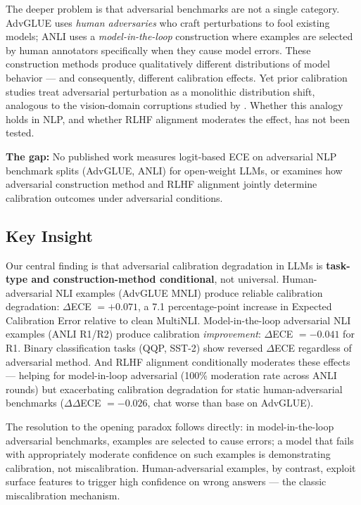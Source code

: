 The deeper problem is that adversarial benchmarks are not a single category. AdvGLUE uses \textit{human adversaries} who craft perturbations to fool existing models; ANLI uses a \textit{model-in-the-loop} construction where examples are selected by human annotators specifically when they cause model errors. These construction methods produce qualitatively different distributions of model behavior --- and consequently, different calibration effects. Yet prior calibration studies treat adversarial perturbation as a monolithic distribution shift, analogous to the vision-domain corruptions studied by \citet{minderer2021revisiting}. Whether this analogy holds in NLP, and whether RLHF alignment moderates the effect, has not been tested.

\textbf{The gap:} No published work measures logit-based ECE on adversarial NLP benchmark splits (AdvGLUE, ANLI) for open-weight LLMs, or examines how adversarial construction method and RLHF alignment jointly determine calibration outcomes under adversarial conditions.

\subsection{Key Insight}

Our central finding is that adversarial calibration degradation in LLMs is \textbf{task-type and construction-method conditional}, not universal. Human-adversarial NLI examples (AdvGLUE MNLI) produce reliable calibration degradation: $\Delta$ECE $= +0.071$, a 7.1 percentage-point increase in Expected Calibration Error relative to clean MultiNLI. Model-in-the-loop adversarial NLI examples (ANLI R1/R2) produce calibration \textit{improvement}: $\Delta$ECE $= -0.041$ for R1. Binary classification tasks (QQP, SST-2) show reversed $\Delta$ECE regardless of adversarial method. And RLHF alignment conditionally moderates these effects --- helping for model-in-loop adversarial (100\% moderation rate across ANLI rounds) but exacerbating calibration degradation for static human-adversarial benchmarks ($\Delta\Delta$ECE $= -0.026$, chat worse than base on AdvGLUE).

The resolution to the opening paradox follows directly: in model-in-the-loop adversarial benchmarks, examples are selected to cause errors; a model that fails with appropriately moderate confidence on such examples is demonstrating calibration, not miscalibration. Human-adversarial examples, by contrast, exploit surface features to trigger high confidence on wrong answers --- the classic miscalibration mechanism.

